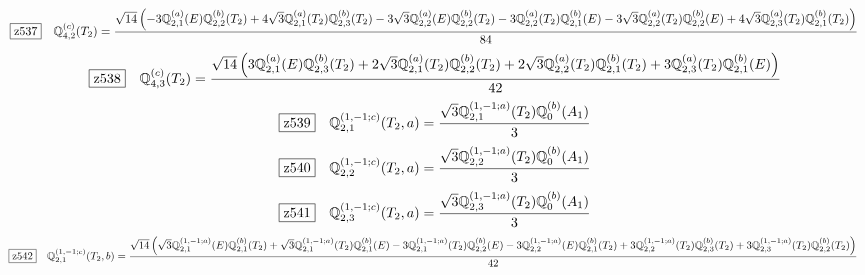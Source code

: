 \documentclass[fleqn,10pt,landscape]{jsarticle}
\begin{document}
\begin{dmath*}
\hspace*{3mm}\fbox{z537}\quad \mathbb{Q}_{4,2}^{(c)}(T_{2})=\frac{\sqrt{14} \left(- 3 \mathbb{Q}_{2,1}^{(a)}(E) \mathbb{Q}_{2,2}^{(b)}(T_{2}) + 4 \sqrt{3} \mathbb{Q}_{2,1}^{(a)}(T_{2}) \mathbb{Q}_{2,3}^{(b)}(T_{2}) - 3 \sqrt{3} \mathbb{Q}_{2,2}^{(a)}(E) \mathbb{Q}_{2,2}^{(b)}(T_{2}) - 3 \mathbb{Q}_{2,2}^{(a)}(T_{2}) \mathbb{Q}_{2,1}^{(b)}(E) - 3 \sqrt{3} \mathbb{Q}_{2,2}^{(a)}(T_{2}) \mathbb{Q}_{2,2}^{(b)}(E) + 4 \sqrt{3} \mathbb{Q}_{2,3}^{(a)}(T_{2}) \mathbb{Q}_{2,1}^{(b)}(T_{2})\right)}{84}
\end{dmath*}
\begin{dmath*}
\hspace*{3mm}\fbox{z538}\quad \mathbb{Q}_{4,3}^{(c)}(T_{2})=\frac{\sqrt{14} \left(3 \mathbb{Q}_{2,1}^{(a)}(E) \mathbb{Q}_{2,3}^{(b)}(T_{2}) + 2 \sqrt{3} \mathbb{Q}_{2,1}^{(a)}(T_{2}) \mathbb{Q}_{2,2}^{(b)}(T_{2}) + 2 \sqrt{3} \mathbb{Q}_{2,2}^{(a)}(T_{2}) \mathbb{Q}_{2,1}^{(b)}(T_{2}) + 3 \mathbb{Q}_{2,3}^{(a)}(T_{2}) \mathbb{Q}_{2,1}^{(b)}(E)\right)}{42}
\end{dmath*}
\begin{dmath*}
\hspace*{3mm}\fbox{z539}\quad \mathbb{Q}_{2,1}^{(1,-1;c)}(T_{2},a)=\frac{\sqrt{3} \mathbb{Q}_{2,1}^{(1,-1;a)}(T_{2}) \mathbb{Q}_{0}^{(b)}(A_{1})}{3}
\end{dmath*}
\begin{dmath*}
\hspace*{3mm}\fbox{z540}\quad \mathbb{Q}_{2,2}^{(1,-1;c)}(T_{2},a)=\frac{\sqrt{3} \mathbb{Q}_{2,2}^{(1,-1;a)}(T_{2}) \mathbb{Q}_{0}^{(b)}(A_{1})}{3}
\end{dmath*}
\begin{dmath*}
\hspace*{3mm}\fbox{z541}\quad \mathbb{Q}_{2,3}^{(1,-1;c)}(T_{2},a)=\frac{\sqrt{3} \mathbb{Q}_{2,3}^{(1,-1;a)}(T_{2}) \mathbb{Q}_{0}^{(b)}(A_{1})}{3}
\end{dmath*}
\begin{dmath*}
\hspace*{3mm}\fbox{z542}\quad \mathbb{Q}_{2,1}^{(1,-1;c)}(T_{2},b)=\frac{\sqrt{14} \left(\sqrt{3} \mathbb{Q}_{2,1}^{(1,-1;a)}(E) \mathbb{Q}_{2,1}^{(b)}(T_{2}) + \sqrt{3} \mathbb{Q}_{2,1}^{(1,-1;a)}(T_{2}) \mathbb{Q}_{2,1}^{(b)}(E) - 3 \mathbb{Q}_{2,1}^{(1,-1;a)}(T_{2}) \mathbb{Q}_{2,2}^{(b)}(E) - 3 \mathbb{Q}_{2,2}^{(1,-1;a)}(E) \mathbb{Q}_{2,1}^{(b)}(T_{2}) + 3 \mathbb{Q}_{2,2}^{(1,-1;a)}(T_{2}) \mathbb{Q}_{2,3}^{(b)}(T_{2}) + 3 \mathbb{Q}_{2,3}^{(1,-1;a)}(T_{2}) \mathbb{Q}_{2,2}^{(b)}(T_{2})\right)}{42}
\end{dmath*}
\end{document}
